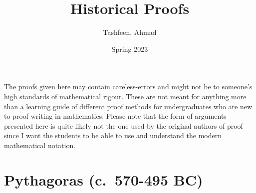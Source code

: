 \documentclass{homework}
\author{Tashfeen, Ahmad}
\date{Spring 2023}
\title{Historical Proofs}
\begin{document}
 \maketitle


\begin{footnotesize}
    The proofs given here may contain careless-errors and might not be to someone's high standards of mathematical rigour. These are not meant for anything more than a learning guide of different proof methods for undergraduates who are new to proof writing in mathematics. Please note that the form of arguments presented here is quite likely not the one used by the original authors of proof since I want the students to be able to use and understand the modern mathematical notation.
\end{footnotesize}


\section{Pythagoras (c.  570-495 BC)}
\end{document}
